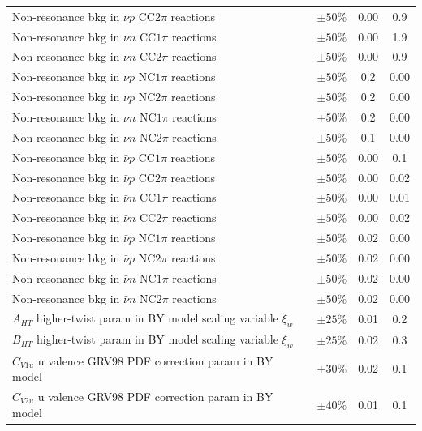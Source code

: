 \begin{longtable}{p{3.5in} c c c}
  Non-resonance bkg in $\nu p$ CC$2\pi$ reactions & $\pm50\%$ & 0.00 & 0.9 \\
  Non-resonance bkg in $\nu n$ CC$1\pi$ reactions & $\pm50\%$ & 0.00 & 1.9 \\
  Non-resonance bkg in $\nu n$ CC$2\pi$ reactions & $\pm50\%$ & 0.00 & 0.9 \\
  Non-resonance bkg in $\nu p$ NC$1\pi$ reactions & $\pm50\%$ & 0.2 & 0.00 \\
  Non-resonance bkg in $\nu p$ NC$2\pi$ reactions & $\pm50\%$ & 0.2 & 0.00 \\
  Non-resonance bkg in $\nu n$ NC$1\pi$ reactions & $\pm50\%$ & 0.2 & 0.00 \\
  Non-resonance bkg in $\nu n$ NC$2\pi$ reactions & $\pm50\%$ & 0.1 & 0.00 \\
  Non-resonance bkg in $\bar{\nu} p$ CC$1\pi$ reactions & $\pm50\%$ & 0.00 & 0.1 \\
  Non-resonance bkg in $\bar{\nu} p$ CC$2\pi$ reactions & $\pm50\%$ & 0.00 & 0.02 \\
  Non-resonance bkg in $\bar{\nu} n$ CC$1\pi$ reactions & $\pm50\%$ & 0.00 & 0.01 \\
  Non-resonance bkg in $\bar{\nu} n$ CC$2\pi$ reactions & $\pm50\%$ & 0.00 & 0.02 \\
  Non-resonance bkg in $\bar{\nu} p$ NC$1\pi$ reactions & $\pm50\%$ & 0.02 & 0.00 \\
  Non-resonance bkg in $\bar{\nu} p$ NC$2\pi$ reactions & $\pm50\%$ & 0.02 & 0.00 \\
  Non-resonance bkg in $\bar{\nu} n$ NC$1\pi$ reactions & $\pm50\%$ & 0.02 & 0.00 \\
  Non-resonance bkg in $\bar{\nu} n$ NC$2\pi$ reactions & $\pm50\%$ & 0.02 & 0.00 \\
  $A_{HT}$ higher-twist param in BY model scaling \newline variable $\xi_w$ & $\pm25\%$ & 0.01 & 0.2 \\
  $B_{HT}$ higher-twist param in BY model scaling \newline variable $\xi_w$ & $\pm25\%$ & 0.02 & 0.3 \\
  $C_{V1u}$ u valence GRV98 PDF correction param in BY model & $\pm30\%$ & 0.02 & 0.1 \\
  $C_{V2u}$ u valence GRV98 PDF correction param in BY model & $\pm40\%$ & 0.01 & 0.1 \\

\end{longtable}
